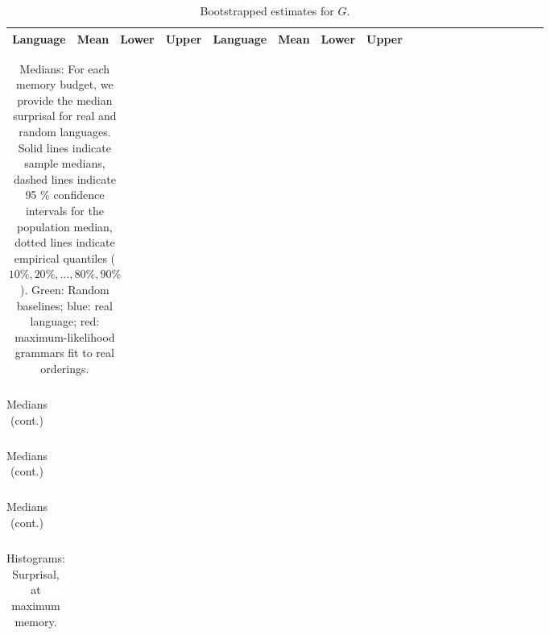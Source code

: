 \documentclass[11pt,letterpaper]{article}
\begin{document}
\begin{table}
\begin{longtable}{l|lll||l|lllllllllllllll}
	Language & Mean & Lower & Upper & Language & Mean & Lower & Upper \\ \hline

\end{longtable}
	\caption{Bootstrapped estimates for $G$.}\label{tab:boot-g}
\end{table}



\begin{table}
\begin{longtable}{ccccccccccccccclll}

\end{longtable}
	\caption{Medians: For each memory budget, we provide the median surprisal for real and random languages. Solid lines indicate sample medians, dashed lines indicate 95 $\%$ confidence intervals for the population median, dotted lines indicate empirical quantiles ($10\%, 20\%, \dots, 80\%, 90\%$). Green: Random baselines; blue: real language; red: maximum-likelihood grammars fit to real orderings.}\label{tab:medians}
\end{table}

\begin{table}
\begin{longtable}{ccccccccccccccclll}

\end{longtable}
	\caption{Medians (cont.)}
\end{table}

\begin{table}
\begin{longtable}{ccccccccccccccclll}

\end{longtable}
	\caption{Medians (cont.)}
\end{table}

\begin{table}
\begin{longtable}{ccccccccccccccclll}

\end{longtable}
	\caption{Medians (cont.)}
\end{table}







\begin{table}
\begin{tabular}{ccccccccccccccclll}

\end{tabular}
	\caption{Histograms: Surprisal, at maximum memory.}\label{tab:slice-hists-real}
\end{table}
\end{document}
